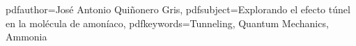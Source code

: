 \newcommand{\doctitle}{Explorando el efecto túnel en la molécula de amoníaco} %
\newcommand{\doctype}{Trabajo Fin de Grado}

\newcommand{\department}{Departamento de Química Física} %
\newcommand{\degree}{Grado} %
\newcommand{\major}{Química} %
\newcommand{\defenseDate}{Junio 2022} %

\newcommand{\authorName}{José Antonio Quiñonero Gris}

\newcommand{\supervisor}{José Zúñiga Román}

\newcommand{\cosupervisor}{Mr. Co-Supervisor's Name}

\newcommand{\tribunalI}{Persona x}
\newcommand{\tribunalII}{Persona y}
\newcommand{\tribunalIII}{Persona z}

\newcommand{\Year}{\the\year{}}

\newcommand{\signatureDate}{\ddmmyyyydate\today}

\newcommand{\keywords}{Tunneling, Quantum Mechanics, Ammonia}

\newcommand{\university}{Universidad de Murcia}
\newcommand{\school}{Facultad de Química}

\hypersetup
{
    pdfauthor={\authorName},
    pdfsubject={\doctitle},
    pdfkeywords={\keywords}
}
